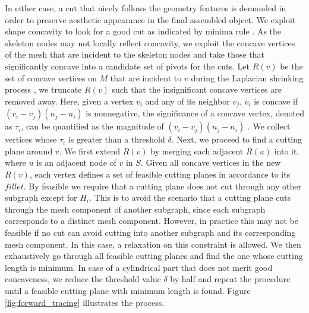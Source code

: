 In either case, a cut that nicely follows the geometry features is demanded in order to preserve aesthetic appearance in the final assembled object. We exploit shape concavity to look for a good cut as indicated by minima rule \cite{hoffman1984parts,hoffman1997salience}. As the skeleton nodes may not locally reflect concavity, we exploit the concave vertices of the mesh that are incident to the skeleton nodes and take those that significantly concave into a candidate set of pivots for the cuts. Let $R(v)$ be the set of concave vertices on $M$ that are incident to $v$ during the Laplacian shrinking process \cite{AuTCCL08}, we truncate $R(v)$ such that the insignificant concave vertices are removed away. Here, given a vertex $v_i$ and any of its neighbor $v_j$, $v_i$ is concave if $(v_i - v_j)(n_j - n_i)$ is nonnegative, the significance of a concave vertex, denoted as $\tau_i$, can be quantified as the magnitude of $(v_i - v_j)(n_j - n_i)$ \cite{au2012mesh}. We collect vertices whose $\tau_i$ is greater than a threshold $\delta$.
Next, we proceed to find a cutting plane around $v$. We first extend $R(v)$ by merging each adjacent $R(u)$ into it, where $u$ is an adjacent node of $v$ in $S$. Given all concave vertices in the new $R(v)$, each vertex defines a set of feasible cutting planes in accordance to its $fillet$. By feasible we require that a cutting plane does not cut through any other subgraph except for $H_i$. This is to avoid the scenario that a cutting plane cuts through the mesh component of another subgraph, since each subgraph corresponds to a distinct mesh component. However, in practice this may not be feasible if no cut can avoid cutting into another subgraph and its corresponding mesh component. In this case, a relaxation on this constraint is allowed. We then exhaustively go through all feasible cutting planes and find the one whose cutting length is minimum. In case of a cylindrical part that does not merit good concaveness, we reduce the threshold value $\delta$ by half and repeat the procedure until a feasible cutting plane with minimum length is found. Figure \ref{fig:forward_tracing} illustrates the process.

